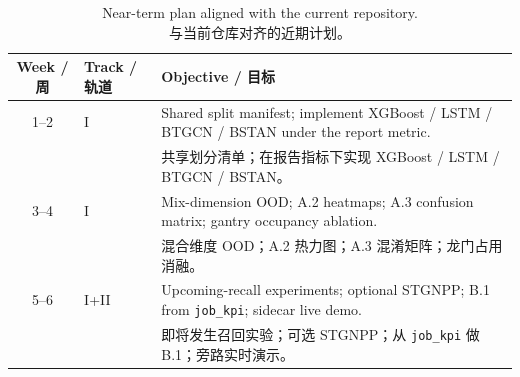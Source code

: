 \documentclass[12pt,a4paper,oneside,scheme=plain]{ctexrep}
\begin{document}
\begin{table}[ht]
\centering
\caption{Near-term plan aligned with the current repository.\\
{\small 与当前仓库对齐的近期计划。}}
\label{tab:plan}
\begin{tabular}{clp{}}
\toprule
Week / 周 & Track / 轨道 & Objective / 目标 \\
\midrule
1--2 & I & Shared split manifest; implement XGBoost / LSTM / BTGCN / BSTAN under the report metric. \\
 &  & {\small 共享划分清单；在报告指标下实现 XGBoost / LSTM / BTGCN / BSTAN。} \\
3--4 & I & Mix-dimension OOD; A.2 heatmaps; A.3 confusion matrix; gantry occupancy ablation. \\
 &  & {\small 混合维度 OOD；A.2 热力图；A.3 混淆矩阵；龙门占用消融。} \\
5--6 & I+II & Upcoming-recall experiments; optional STGNPP; B.1 from \texttt{job\_kpi}; sidecar live demo. \\
 &  & {\small 即将发生召回实验；可选 STGNPP；从 \texttt{job\_kpi} 做 B.1；旁路实时演示。} \\
\bottomrule
\end{tabular}
\end{table}
\end{document}
